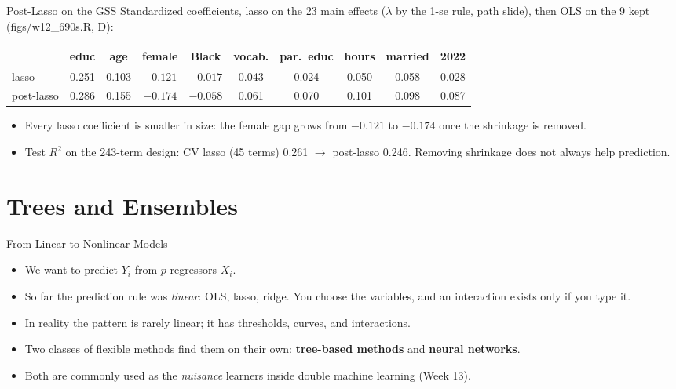 \documentclass[aspectratio=169,11pt,xcolor=dvipsnames]{beamer}
\newcommand{\srcp}[1]{{\scriptsize\color{gray}(#1)}}
\newcommand{\core}{\,\raisebox{0.6pt}{\textcolor{corestar}{$\bigstar$}}}
\begin{document}
\begin{frame}{Post-Lasso on the GSS}
Standardized coefficients, lasso on the 23 main effects ($\lambda$ by the 1-se rule, path slide),
then OLS on the 9 kept \srcp{figs/w12\_690s.R, D}:
\begin{center}\footnotesize
\renewcommand{\arraystretch}{1.1}
\begin{tabular}{@{}lccccccccc@{}}
\toprule
& educ & age & female & Black & vocab. & par.\ educ & hours & married & 2022 \\
\midrule
lasso & 0.251 & 0.103 & $-0.121$ & $-0.017$ & 0.043 & 0.024 & 0.050 & 0.058 & 0.028 \\
post-lasso & 0.286 & 0.155 & $-0.174$ & $-0.058$ & 0.061 & 0.070 & 0.101 & 0.098 & 0.087 \\
\bottomrule
\end{tabular}
\end{center}
\vskip3pt
\begin{itemize}\itemsep3pt
  \item Every lasso coefficient is smaller in size: the female gap grows from
        $-0.121$ to $-0.174$ once the shrinkage is removed.
  \item Test $R^2$ on the 243-term design: CV lasso (45 terms) 0.261 $\to$ post-lasso 0.246.
        Removing shrinkage does not always help prediction.
\end{itemize}
\end{frame}

\section[Trees]{Trees and Ensembles}
\begin{frame}\sectionpage\end{frame}

\begin{frame}{From Linear to Nonlinear Models\core}
\begin{itemize}\itemsep4pt
  \item We want to predict $Y_i$ from $p$ regressors $X_i$.
  \item So far the prediction rule was \textit{linear}: OLS, lasso, ridge. You choose
        the variables, and an interaction exists only if you type it.
  \item In reality the pattern is rarely linear; it has thresholds, curves, and
        interactions.
  \item Two classes of flexible methods find them on their own: \textbf{tree-based
        methods} and \textbf{neural networks}.
  \item Both are commonly used as the \textit{nuisance} learners inside double
        machine learning (Week 13).
\end{itemize}
\end{frame}
\end{document}
